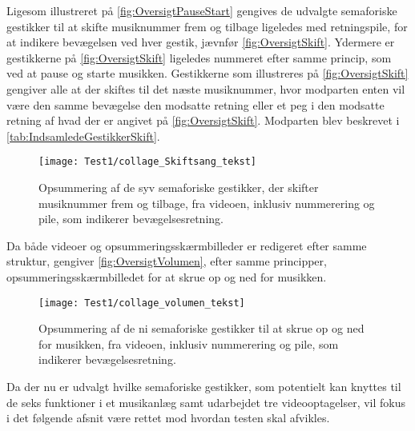 \noindent
%
Ligesom illustreret på \autoref{fig:OversigtPauseStart} gengives de udvalgte semaforiske gestikker til at skifte musiknummer frem og tilbage ligeledes med retningspile, for at indikere bevægelsen ved hver gestik, jævnfør \autoref{fig:OversigtSkift}. Ydermere er gestikkerne på \autoref{fig:OversigtSkift} ligeledes nummeret efter samme princip, som ved at pause og starte musikken. Gestikkerne som illustreres på \autoref{fig:OversigtSkift} gengiver alle at der skiftes til det næste musiknummer, hvor modparten enten vil være den samme bevægelse den modsatte retning eller et peg i den modsatte retning af hvad der er angivet på \autoref{fig:OversigtSkift}. Modparten blev beskrevet i \autoref{tab:IndsamledeGestikkerSkift}.
%
\begin{figure}[H]
	\centering
	\texttt{[image: Test1/collage\_Skiftsang\_tekst]}
	\caption{Opsummering af de syv semaforiske gestikker, der skifter musiknummer frem og tilbage, fra videoen, inklusiv nummerering og pile, som indikerer bevægelsesretning.}
	\label{fig:OversigtSkift}
\end{figure}
\noindent
%
Da både videoer og opsummeringsskærmbilleder er redigeret efter samme struktur, gengiver \autoref{fig:OversigtVolumen}, efter samme principper, opsummeringsskærmbilledet for at skrue op og ned for musikken.  
%
\begin{figure}[H]
	\centering
	\texttt{[image: Test1/collage\_volumen\_tekst]}
	\caption{Opsummering af de ni semaforiske gestikker til at skrue op og ned for musikken, fra videoen, inklusiv nummerering og pile, som indikerer bevægelsesretning.}
	\label{fig:OversigtVolumen}
\end{figure}
\noindent
%
Da der nu er udvalgt hvilke semaforiske gestikker, som potentielt kan knyttes til de seks funktioner i et musikanlæg samt udarbejdet tre videooptagelser, vil fokus i det følgende afsnit være rettet mod hvordan testen skal afvikles. 
